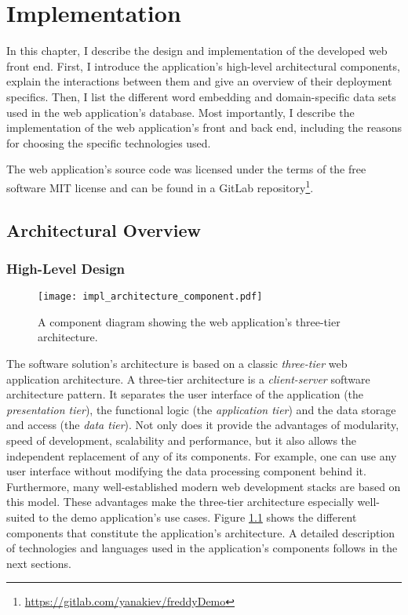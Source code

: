 
\chapter{Implementation}
\label{cha:implementation}
In this chapter, I describe the design and implementation of the developed web front end. First, I introduce the application's high-level architectural components, explain the interactions between them and give an overview of their deployment specifics. Then, I list the different word embedding and domain-specific data sets used in the web application's database. Most importantly, I describe the implementation of the web application's front and back end, including the reasons for choosing the specific technologies used.

The web application's source code was licensed under the terms of the free software MIT license and can be found in a GitLab repository\footnote{\url{https://gitlab.com/yanakiev/freddyDemo}}.

\section{Architectural Overview}
\label{sec:architecture}
\subsection{High-Level Design}
\begin{figure}
	\centering\texttt{[image: impl\_architecture\_component.pdf]}
	\caption{A component diagram showing the web application's three-tier architecture.}
	\label{fig:architecture_component}
\end{figure}
The software solution's architecture is based on a classic \textit{three-tier} web application architecture. A three-tier architecture is a \textit{client-server} software architecture pattern. It separates the user interface of the application (the \textit{presentation tier}), the functional logic (the \textit{application tier}) and the data storage and access (the \textit{data tier}). Not only does it provide the advantages of modularity, speed of development, scalability and performance, but it also allows the independent replacement of any of its components. For example, one can use any user interface without modifying the data processing component behind it. Furthermore, many well-established modern web development stacks are based on this model. These advantages make the three-tier architecture especially well-suited to the demo application's use cases. Figure \ref{fig:architecture_component} shows the different components that constitute the application's architecture. A detailed description of technologies and languages used in the application's components follows in the next sections.

